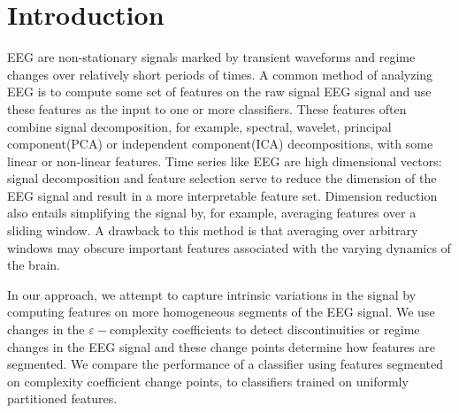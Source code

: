 \section{Introduction}

EEG are non-stationary signals 
marked by transient waveforms and regime changes over relatively short periods of times.
A common method of analyzing EEG is to compute 
some set of features on the raw signal EEG signal
and use these features as the input to one or more classifiers. 
These features often combine signal decomposition, for example, spectral, wavelet, principal component(PCA) or independent component(ICA) decompositions, with 
some linear or non-linear features\cite{alotaiby2014}.
Time series like EEG are high dimensional vectors: signal decomposition and feature selection
serve to reduce the dimension of the EEG signal and result in a more interpretable feature set. Dimension reduction also entails simplifying the signal by, for example, averaging features over a sliding window.
A drawback to this method is that averaging over arbitrary windows may obscure important features associated with the varying dynamics of the brain. 

In our approach, we attempt to capture intrinsic variations in the signal by computing features on more homogeneous segments of the EEG signal. We use changes in the $\varepsilon-$complexity coefficients to detect discontinuities or regime changes in the EEG signal and these 
change points determine how features are segmented. We compare the performance of a classifier using features segmented on complexity coefficient change points, to classifiers trained on uniformly partitioned features.




